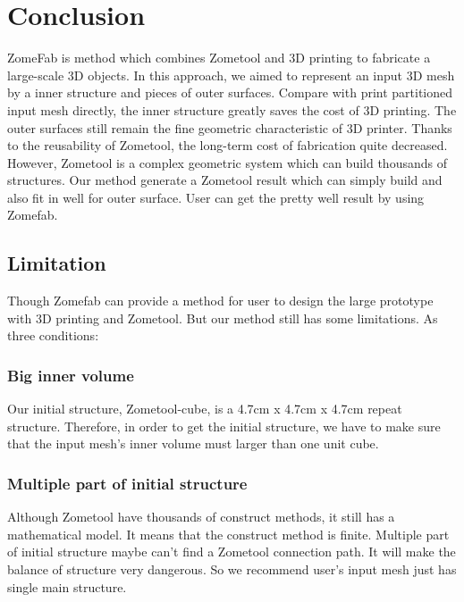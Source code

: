 \section{Conclusion}
\label{sec:conclusion}

ZomeFab is method which combines Zometool and 3{D} printing to fabricate a large-scale 3{D} objects. In this approach, we aimed to represent an input 3D mesh by a inner structure and pieces of outer surfaces. Compare with print partitioned input mesh directly, the inner structure greatly saves the cost of 3D printing. The outer surfaces still remain the fine geometric characteristic of 3D printer. Thanks to the reusability of Zometool, the long-term cost of fabrication quite decreased. However, Zometool is a complex geometric system which can build thousands of structures. Our method generate a Zometool result which can simply build and also fit in well for outer surface. User can get the pretty well result by using Zomefab.

\subsection{Limitation}

Though Zomefab can provide a method for user to design the large prototype with 3{D} printing and Zometool. But our method still has some limitations. As three conditions: 

\subsubsection{Big inner volume} 
Our initial structure, Zometool-cube, is a 4.7cm x 4.7cm x 4.7cm repeat structure. Therefore, in order to get the initial structure, we have to make sure that the input mesh's inner volume must larger than one unit cube. %

\subsubsection{Multiple part of initial structure} 
Although Zometool have thousands of construct methods, it still has a mathematical model. It means that the construct method is finite. Multiple part of initial structure maybe can't find a Zometool connection path. It will make the balance of structure very dangerous. So we recommend user's input mesh just has single main structure. 

